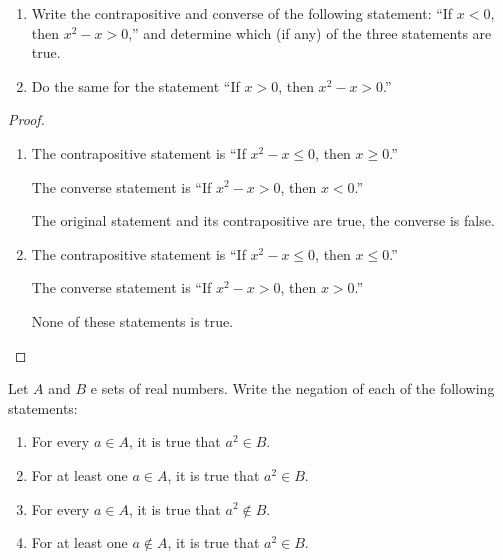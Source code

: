 \begin{exercise}\label{chapter1:section1:exercise3}
    \begin{enumerate}[label={(\alph*)}]
        \item Write the contrapositive and converse of the following statement: ``If $x < 0$, then $x^{2} - x > 0$,{}'' and determine which (if any) of the three statements are true.
        \item Do the same for the statement ``If $x > 0$, then $x^{2} - x > 0$.{}''
    \end{enumerate}
\end{exercise}

\begin{proof}
    \begin{enumerate}[label={(\alph*)}]
        \item The contrapositive statement is ``If $x^{2} - x\leq 0$, then $x\geq 0${.}''

              The converse statement is ``If $x^{2} - x > 0$, then $x < 0${.}''

              The original statement and its contrapositive are true, the converse is false.
        \item The contrapositive statement is ``If $x^{2} - x\leq 0$, then $x\leq 0${.}''

              The converse statement is ``If $x^{2} - x > 0$, then $x > 0${.}''

              None of these statements is true.
    \end{enumerate}
\end{proof}

\begin{exercise}\label{chapter1:section1:exercise4}
    Let $A$ and $B$ e sets of real numbers. Write the negation of each of the following statements:
    \begin{enumerate}[label={(\alph*)}]
        \item For every $a\in A$, it is true that $a^{2}\in B$.
        \item For at least one $a\in A$, it is true that $a^{2}\in B$.
        \item For every $a\in A$, it is true that $a^{2}\notin B$.
        \item For at least one $a\notin A$, it is true that $a^{2}\in B$.
    \end{enumerate}
\end{exercise}

